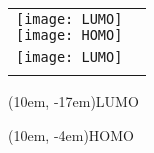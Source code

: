\documentclass[varwidth=23em]{standalone}
\begin{document}
	\begin{tabular}[c]{p{20em}p{55em}}
		\shortstack[c]{
			\texttt{[image: LUMO]}\\[-1.0cm] 
		\texttt{[image: HOMO]}}
		& 
		\shortstack[c]{
			\texttt{[image: LUMO]}\\[0.1cm]%
		\texttt{[image: LUMO]}\\[0.3cm]}
	\end{tabular}
	\begin{textblock*}{5em}(10em, -17em)\sf LUMO\end{textblock*}
	\begin{textblock*}{5em}(10em, -4em)\sf HOMO\end{textblock*}
\end{document}
